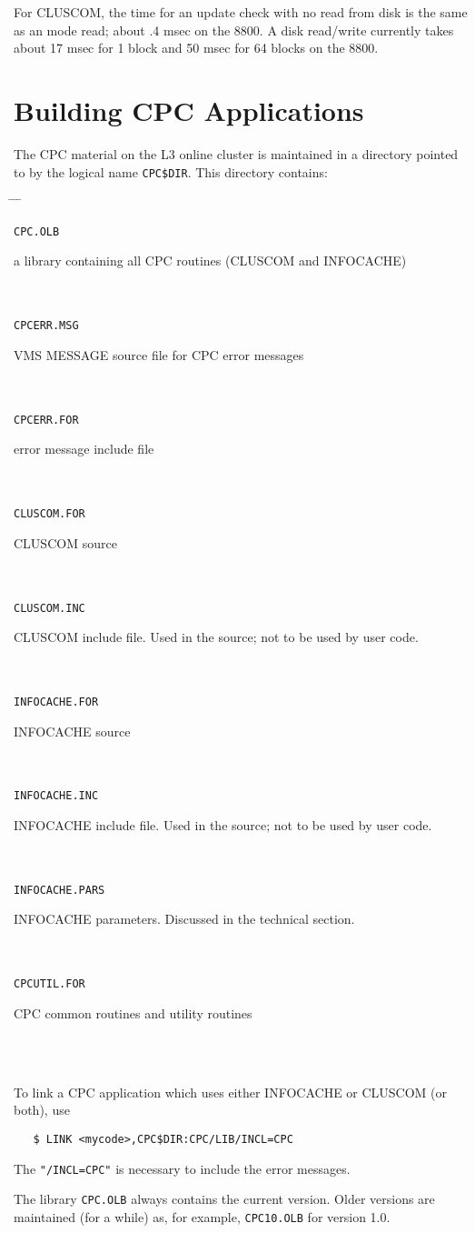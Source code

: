 For CLUSCOM, the time for an update check with no read from disk is
the same as an \info mode read; about .4 msec on the 8800.
A disk read/write currently takes about 17 msec for 1 block and 50 msec
for 64 blocks on the 8800.

\newpage
\part{Building CPC Applications}

The CPC material on the L3 online cluster is maintained in a directory
pointed to by the logical name \verb|CPC$DIR|. This directory contains:

\newcommand{\cpcfile}[2]{ \tt #1 \> \begin{minipage}[t]{9.7cm}{\rm #2}
  \end{minipage} \\ \\ }
\begin{tabbing}
\hspace*{5.0cm} \= \hspace*{5.0cm} \= \hspace*{2.5cm} \= \kill 

\noindent
\cpcfile{CPC.OLB}{a library containing all CPC routines 
  (CLUSCOM and INFOCACHE)}
\cpcfile{CPCERR.MSG}{VMS MESSAGE source file for CPC error messages}
\cpcfile{CPCERR.FOR}{error message include file}
\cpcfile{CLUSCOM.FOR}{CLUSCOM source}
\cpcfile{CLUSCOM.INC}{CLUSCOM include file. Used in the source; not to
  be used by user code.}
\cpcfile{INFOCACHE.FOR}{INFOCACHE source}
\cpcfile{INFOCACHE.INC}{INFOCACHE include file. Used in the source; not to
  be used by user code.}
\cpcfile{INFOCACHE.PARS}{INFOCACHE parameters. Discussed in the technical
  section.}
\cpcfile{CPCUTIL.FOR}{CPC common routines and utility routines}
\end{tabbing}

To link a CPC application which uses either INFOCACHE or CLUSCOM (or both),
use
\begin{verbatim}
   $ LINK <mycode>,CPC$DIR:CPC/LIB/INCL=CPC
\end{verbatim}

The \verb|"/INCL=CPC"| is necessary to include the error messages.

The library \verb|CPC.OLB| always contains the current version. Older versions
are maintained (for a while) as, for example, \verb|CPC10.OLB| for
version 1.0.

